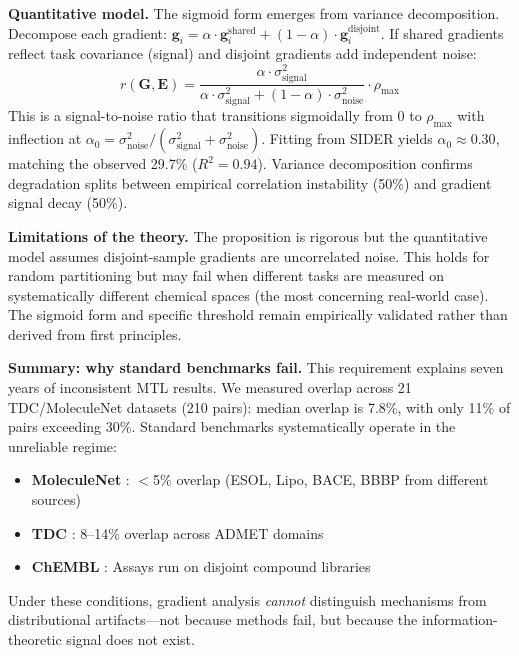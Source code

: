 \documentclass[sigconf,nonacm]{acmart}
\newcommand{\G}{\mathbf{G}}
\newcommand{\E}{\mathbf{E}}
\begin{document}
\textbf{Quantitative model.} The sigmoid form emerges from variance decomposition. Decompose each gradient: $\mathbf{g}_i = \alpha \cdot \mathbf{g}_i^{\text{shared}} + (1-\alpha) \cdot \mathbf{g}_i^{\text{disjoint}}$. If shared gradients reflect task covariance (signal) and disjoint gradients add independent noise:
\begin{equation}
    r(\G, \E) = \frac{\alpha \cdot \sigma^2_{\text{signal}}}{\alpha \cdot \sigma^2_{\text{signal}} + (1-\alpha) \cdot \sigma^2_{\text{noise}}} \cdot \rho_{\text{max}}
\label{eq:theory}
\end{equation}
This is a signal-to-noise ratio that transitions sigmoidally from 0 to $\rho_{\text{max}}$ with inflection at $\alpha_0 = \sigma^2_{\text{noise}} / (\sigma^2_{\text{signal}} + \sigma^2_{\text{noise}})$. Fitting from SIDER yields $\alpha_0 \approx 0.30$, matching the observed 29.7\% ($R^2 = 0.94$). Variance decomposition confirms degradation splits between empirical correlation instability (50\%) and gradient signal decay (50\%).

\textbf{Limitations of the theory.} The proposition is rigorous but the quantitative model assumes disjoint-sample gradients are uncorrelated noise. This holds for random partitioning but may fail when different tasks are measured on systematically different chemical spaces (the most concerning real-world case). The sigmoid form and specific threshold remain empirically validated rather than derived from first principles.

\textbf{Summary: why standard benchmarks fail.} This requirement explains seven years of inconsistent MTL results. We measured overlap across 21 TDC/MoleculeNet datasets (210 pairs): median overlap is 7.8\%, with only 11\% of pairs exceeding 30\%. Standard benchmarks systematically operate in the unreliable regime:
\begin{itemize}[nosep,topsep=0pt]
    \item \textbf{MoleculeNet} \cite{wu2018moleculenet}: $<$5\% overlap (ESOL, Lipo, BACE, BBBP from different sources)
    \item \textbf{TDC} \cite{huang2021therapeutics}: 8--14\% overlap across ADMET domains
    \item \textbf{ChEMBL} \cite{gaulton2012chembl}: Assays run on disjoint compound libraries
\end{itemize}%
Under these conditions, gradient analysis \textit{cannot} distinguish mechanisms from distributional artifacts---not because methods fail, but because the information-theoretic signal does not exist.
\end{document}
